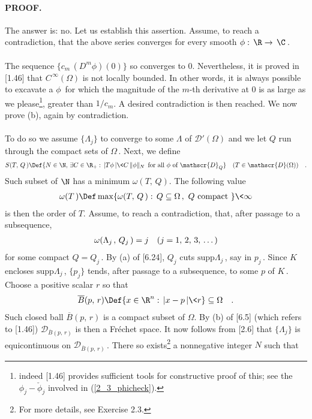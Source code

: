 \paragraph{PROOF.} The answer is: no. Let us establish this assertion. Assume, to reach a contradiction, that the above series converges for every smooth $\phi:\, \R\to\,\C\,$. \\
\\
The sequence $\{c_m\, (D^m\phi)(0)\}$ so converges to $0$. Nevertheless, it is proved in [1.46] that $C^{\,\infty}(\Omega)$ is not locally bounded. In other words, it is always possible to excavate a $\phi\,$ for which the magnitude of the $m$-th derivative at $0$ is as large as we please\footnote{indeed [1.46] provides sufficient tools for constructive proof of this; see the $\phi_j-\check{\phi}_j$ involved in (\ref{2_3_phicheck}).}, \eg greater than $1/c_m$.
 A desired contradiction is then reached. We now prove (b), again by contradiction.\\
\\
To do so we assume $\{\Lambda_j\}$ to converge to some $\Lambda$ of $\mathscr{D}'(\Omega)$ and we let $Q$ run through the compact sets of $\Omega\,$. Next, we define
\begin{align}{\label{6_6_1}
S(T,\, Q\,)\Def \{N\in \N, \, \exists C\in \R_+:\, \lvert T\phi\, \rvert \< C\, \| \phi \|_N \,\text{ for all }\phi \text{ of } \mathscr{D}_Q \}\quad (T\in \mathscr{D}(\Omega))\quad .
}\end{align}
Such subset of $\N$ has a minimum $\omega(T,\, Q)$. The following value
\begin{align}{\label{6_6_2}
\omega (T\,) \Def \max\{ \omega(T,\, Q\,): \, Q\subseteq \Omega\, , \,\, Q \text{ compact }\}\< \infty
}\end{align}
is then the order of $T$. Assume, to reach a contradiction, that, after passage to a subsequence,
\begin{align}{\label{6_6_3}
\omega (\Lambda_{j\,},\, Q_j\,) =j\quad (j=1,\, 2,\, 3,\, \dots)
}\end{align}
for some compact $Q=Q_j\,$. By (a) of [6.24], $Q_j$ cuts $\text{supp}\Lambda_j\,$, say in $p_j\,$. Since $K$ encloses $\text{supp}\Lambda_j\,$, $\{p_j\}$ tends, after passage to a subsequence, to some $p$ of $K\,$.
Choose a positive scalar $r$ so that 
\begin{align}{\label{6_6_5}
\overline{B}(p,\, r)\Def \{ x\in \R^n:\, \lvert x-p\,\rvert\< r\}\subseteq \Omega \quad .
}\end{align}
Such closed ball $\overline{B}(p,\, r)$ is a compact subset of $\Omega$. By (b) of [6.5] (which refers to [1.46])  $\mathscr{D}_{\overline{B}(p,\, r)}$ is then a Fréchet space. It now follows from [2.6] that $\{\Lambda_j\}$ is equicontinuous on $\mathscr{D}_{\overline{B}(p,\, r)}\,$. There so exists\footnote{For more details, see Exercise 2.3.} a nonnegative integer $N$ such that 
